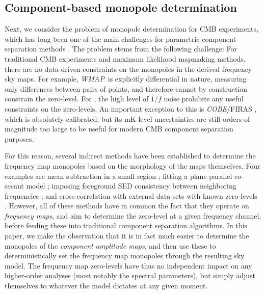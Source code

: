 \documentclass[twocolumn]{aa}
\def\WMAP{\emph{WMAP}}
\def\COBE{\emph{COBE}}
\begin{document}
\subsection{Component-based monopole determination} %
\label{subsec:monopole_sampler}

Next, we consider the problem of monopole determination for CMB
experiments, which has long been one of the main challenges for
parametric component separation methods \citep[see, e.g.,][and
  references therein]{planck2014-a12, wehus2014}. The problem stems
from the following challenge: For traditional CMB experiments and
maximum likelihood mapmaking methods, there are no data-driven
constraints on the monopoles in the derived frequency sky maps. For
example, \WMAP\ is explicitly differential in nature, measuring only
differences between pairs of points, and therefore cannot by
construction constrain the zero-level. For \Planck, the high level of
$1/f$ noise prohibits any useful constraints on the zero-levels. An
important exception to this is \COBE/FIRAS \citep{mather:1994}, which
is absolutely calibrated; but its mK-level uncertainties are still
orders of magnitude too large to be useful for modern CMB component
separation purposes.

For this reason, several indirect methods have been established to
determine the frequency map monopoles based on the morphology of the
maps themselves. Four examples are mean subtraction in a small region
\citep{planck2013-p02b}; fitting a plane-parallel co-secant model
\citep{bennett2003b,planck2014-a03}; imposing foreground SED
consistency between neighboring frequencies \citep{wehus2014}; and
cross-correlation with external data sets with known zero-levels
\citep{planck2014-a09}. However, all of these methods have in common
the fact that they operate on \emph{frequency maps}, and aim to
determine the zero-level at a given frequency channel, before feeding
these into traditional component separation algorithms. In this paper,
we make the observation that it is in fact much easier
to determine the monopoles of the \emph{component amplitude maps}, and
then use these to deterministically set the frequency map monopoles
through the resulting sky model. The frequency map zero-levels have
thus no independent impact on any higher-order analyses (most notably
the spectral parameters), but simply adjust themselves to whatever the
model dictates at any given moment.
\end{document}
